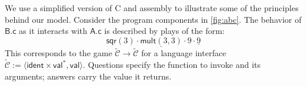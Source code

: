 \documentclass[sigplan,screen,review]{acmart}
\newcommand{\kw}[1]{\ensuremath{ \mathsf{#1} }}
\begin{document}
\begin{example} \label{ex:abc} %
We use a simplified version of C and assembly
to illustrate some of the principles behind our model.
Consider the program components in \autoref{fig:abc}.
The behavior of $\textsf{B.c}$
as it interacts with $\textsf{A.c}$
is described by plays of the form:
\begin{equation} \label{eqn:cplay}
  \mathsf{sqr}(3) \cdot
    \underline{\mathsf{mult}(3,3)} \cdot 9 \cdot \underline{9}
\end{equation}
This corresponds to the game
$\tilde{\mathcal{C}} \rightarrow \tilde{\mathcal{C}}$
for a language interface
$\tilde{\mathcal{C}} :=
 \langle \kw{ident} \times \kw{val}^*, \kw{val} \rangle$.
Questions specify the function to invoke
and its arguments;
answers carry the value it returns.


\end{example}
\end{document}
